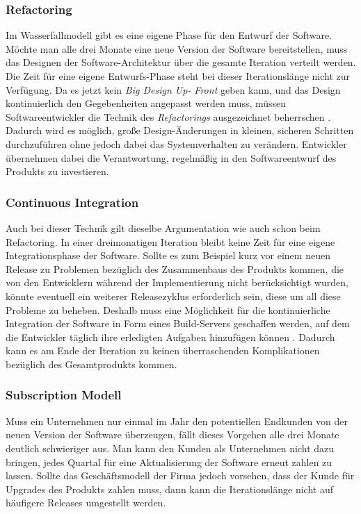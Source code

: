 \subsubsection{Refactoring}
\label{minisec:refactoring}
Im Wasserfallmodell gibt es eine eigene Phase für den Entwurf der Software.
Möchte man alle drei Monate eine neue Version der Software bereitstellen, muss
das Designen der Software-Architektur über die gesamte Iteration verteilt
werden. Die Zeit für eine eigene Entwurfs-Phase steht bei dieser
Iterationslänge nicht zur Verfügung. Da es jetzt kein \emph{Big Design Up-
Front} geben kann, und das Design kontinuierlich den Gegebenheiten angepasst
werden muss, müssen Softwareentwickler die Technik des \emph{Refactorings}
ausgezeichnet beherrschen \cite{fowler1999refactoring}. Dadurch wird es möglich, große Design-Änderungen in
kleinen, sicheren Schritten durchzuführen ohne jedoch dabei das
Systemverhalten zu verändern. Entwickler übernehmen dabei die Verantwortung,
regelmäßig in den Softwareentwurf des Produkts zu investieren.

\subsubsection{Continuous Integration}
\label{minisec:continuous-integration}
Auch bei dieser Technik gilt dieselbe Argumentation wie auch schon beim
Refactoring. In einer dreimonatigen Iteration bleibt keine Zeit für eine
eigene Integrationsphase der Software. Sollte es zum Beispiel kurz vor einem neuen
Release zu Problemen bezüglich des Zusammenbaus des Produkts kommen, die von
den Entwicklern während der Implementierung nicht berücksichtigt wurden,
könnte eventuell ein weiterer Releasezyklus erforderlich sein, diese um all
diese Probleme zu beheben. Deshalb muss eine Möglichkeit für die
kontinuierliche Integration der Software in Form eines Build-Servers
geschaffen werden, auf dem die Entwickler täglich ihre erledigten Aufgaben
hinzufügen können \cite{duvall2007continuous}. Dadurch kann es am Ende der Iteration zu keinen überraschenden Komplikationen bezüglich des Gesamtprodukts kommen.

\subsubsection{Subscription Modell}
\label{minisec:subscription-modell}
Muss ein Unternehmen nur einmal im Jahr den potentiellen Endkunden von der
neuen Version der Software überzeugen, fällt dieses Vorgehen alle drei Monate
deutlich schwieriger aus. Man kann den Kunden als Unternehmen nicht dazu
bringen, jedes Quartal für eine Aktualisierung der Software erneut zahlen zu
lassen. Sollte das Geschäftsmodell der Firma jedoch vorsehen, dass der Kunde
für Upgrades des Produkts zahlen muss, dann kann die Iterationslänge nicht auf
häufigere Releases umgestellt werden. 

